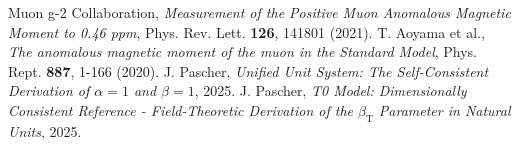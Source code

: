 \documentclass[12pt,a4paper]{article}
\newcommand{\betaT}{\beta_{\text{T}}}
\begin{document}
	\begin{thebibliography}{99}
		 Muon g-2 Collaboration, \textit{Measurement of the Positive Muon Anomalous Magnetic Moment to 0.46 ppm}, Phys. Rev. Lett. \textbf{126}, 141801 (2021).
		 T. Aoyama et al., \textit{The anomalous magnetic moment of the muon in the Standard Model}, Phys. Rept. \textbf{887}, 1-166 (2020).
		 J. Pascher, \textit{Unified Unit System: The Self-Consistent Derivation of  $\alpha = 1$ and $\beta = 1$}, 2025.
		 J. Pascher, \textit{T0 Model: Dimensionally Consistent Reference - Field-Theoretic Derivation of the  $\betaT$ Parameter in Natural Units}, 2025.
	\end{thebibliography}
	
\end{document}
